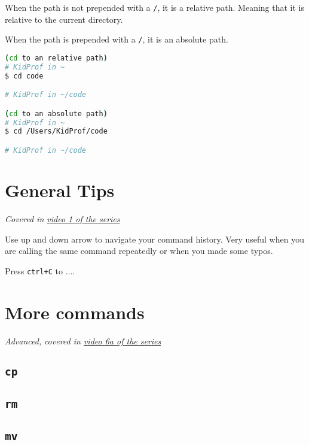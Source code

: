 When the path is not prepended with a \texttt{/}, it is a relative path. Meaning that it is relative to the current directory.

When the path is prepended with a \texttt{/}, it is an absolute path. 

\begin{lstlisting}[language=bash]
(cd to an relative path)
# KidProf in ~
$ cd code

# KidProf in ~/code

(cd to an absolute path)
# KidProf in ~
$ cd /Users/KidProf/code

# KidProf in ~/code
\end{lstlisting}

\section{General Tips}

\textit{Covered in \href{https://www.youtube.com/watch?v=oIsH0V3fRt8&list=PLjGmdnqrOKuYXiu7lgG5HW71jPEUd1XCm&index=2}{video 1 of the series}}
\vspace{6mm}

Use up and down arrow to navigate your command history. Very useful when you are calling the same command repeatedly or when you made some typos.

Press \texttt{ctrl+C} to .... %

\section{More commands}

\textit{Advanced, }
\textit{covered in \href{https://www.youtube.com/watch?v=ZIBEVGrtiVA&list=PLjGmdnqrOKuYXiu7lgG5HW71jPEUd1XCm&index=7}{video 6a of the series}}
\vspace{6mm}

\subsection{\texttt{cp}}

\subsection{\texttt{rm}}

\subsection{\texttt{mv}}

